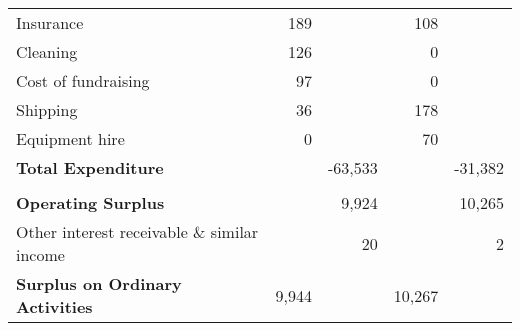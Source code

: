\begin{center}
\begin{tabular}{ l  r  r r r }
Insurance                         & 189     &         & 108    &        \\
Cleaning                          & 126     &         & 0      &        \\
Cost of fundraising               & 97      &         & 0      &        \\
Shipping                          & 36      &         & 178    &        \\
Equipment hire                    & 0       &         & 70     &        \\
{\bf Total Expenditure}           &         & -63,533 &        & -31,382\\
\cmidrule(r){2-3} \cmidrule(r){4-5} \\
{\bf Operating Surplus}           &         & 9,924   &        & 10,265\\
Other interest receivable
\& similar income                 &         & 20      &        & 2     \\
{\bf Surplus on Ordinary Activities}        & 9,944   &        & 10,267 \\
\bottomrule
\end{tabular}
\end{center}
\pagebreak
